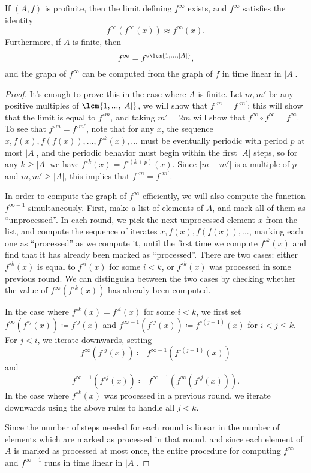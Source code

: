 \begin{prop} If $(A,f)$ is profinite, then the limit defining $f^{\infty}$ exists, and $f^{\infty}$ satisfies the identity
\[
f^{\infty}(f^{\infty}(x)) \approx f^{\infty}(x).
\]
Furthermore, if $A$ is finite, then
\[
f^{\infty} = f^{\circ \lcm\{1, ..., |A|\}},
\]
and the graph of $f^{\infty}$ can be computed from the graph of $f$ in time linear in $|A|$.
\end{prop}
\begin{proof} It's enough to prove this in the case where $A$ is finite. Let $m, m'$ be any positive multiples of $\lcm\{1, ..., |A|\}$, we will show that $f^{\circ m} = f^{\circ m'}$: this will show that the limit is equal to $f^{\circ m}$, and taking $m' = 2m$ will show that $f^\infty \circ f^\infty = f^\infty$. To see that $f^{\circ m} = f^{\circ m'}$, note that for any $x$, the sequence $x, f(x), f(f(x)), ..., f^{\circ k}(x), ...$ must be eventually periodic with period $p$ at most $|A|$, and the periodic behavior must begin within the first $|A|$ steps, so for any $k \ge |A|$ we have $f^{\circ k}(x) = f^{\circ (k+p)}(x)$. Since $|m-m'|$ is a multiple of $p$ and $m,m' \ge |A|$, this implies that $f^{\circ m} = f^{\circ m'}$.

In order to compute the graph of $f^{\infty}$ efficiently, we will also compute the function $f^{\infty - 1}$ simultaneously. First, make a list of elements of $A$, and mark all of them as ``unprocessed''. In each round, we pick the next unprocessed element $x$ from the list, and compute the sequence of iterates $x, f(x), f(f(x)), ...$, marking each one as ``processed'' as we compute it, until the first time we compute $f^{\circ k}(x)$ and find that it has already been marked as ``processed''. There are two cases: either $f^{\circ k}(x)$ is equal to $f^{\circ i}(x)$ for some $i < k$, or $f^{\circ k}(x)$ was processed in some previous round. We can distinguish between the two cases by checking whether the value of $f^\infty(f^{\circ k}(x))$ has already been computed.

In the case where $f^{\circ k}(x) = f^{\circ i}(x)$ for some $i < k$, we first set $f^\infty(f^{\circ j}(x)) \coloneqq f^{\circ j}(x)$ and $f^{\infty-1}(f^{\circ j}(x)) \coloneqq f^{\circ (j-1)}(x)$ for $i < j \le k$. For $j < i$, we iterate downwards, setting
\[
f^\infty(f^{\circ j}(x)) \coloneqq f^{\infty - 1}(f^{\circ (j+1)}(x))
\]
and
\[
f^{\infty-1}(f^{\circ j}(x)) \coloneqq f^{\infty - 1}(f^\infty(f^{\circ j}(x))).
\]
In the case where $f^{\circ k}(x)$ was processed in a previous round, we iterate downwards using the above rules to handle all $j < k$.

Since the number of steps needed for each round is linear in the number of elements which are marked as processed in that round, and since each element of $A$ is marked as processed at most once, the entire procedure for computing $f^\infty$ and $f^{\infty-1}$ runs in time linear in $|A|$.
\end{proof}

